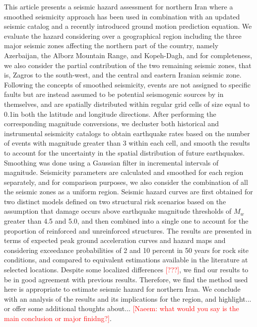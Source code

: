 % 
This article presents a seismic hazard assessment for northern Iran where a smoothed seismicity approach has been used in combination with an updated seismic catalog and a recently introduced ground motion prediction equation. We evaluate the hazard considering over a geographical region including the three major seismic zones affecting the northern part of the country, namely Azerbaijan, the Alborz Mountain Range, and Kopeh-Dagh, and for completeness, we also consider the partial contribution of the two remaining seismic zones, that is, Zagros to the south-west, and the central and eastern Iranian seismic zone. Following the concepts of smoothed seismicity, events are not assigned to specific faults but are instead assumed to be potential seismogenic sources by in themselves, and are spatially distributed within regular grid cells of size equal to 0.1\textdegree in both the latitude and longitude directions. After performing the corresponding magnitude conversions, we decluster both historical and instrumental seismicity catalogs to obtain earthquake rates based on the number of events with magnitude greater than 3 within each cell, and smooth the results to account for the uncertainty in the spatial distribution of future earthquakes. Smoothing was done using a Gaussian filter in incremental intervals of magnitude. Seismicity parameters are calculated and smoothed for each region separately, and for comparison purposes, we also consider the combination of all the seismic zones as a uniform region. Seismic hazard curves are first obtained for two distinct models defined on two structural risk scenarios based on the assumption that damage occurs above earthquake magnitude thresholds of $M_w$ greater than 4.5 and 5.0, and then combined into a single one to account for the proportion of reinforced and unreinforced structures. The results are presented in terms of expected peak ground acceleration curves and hazard maps and considering exceedance probabilities of 2 and 10 percent in 50 years for rock site conditions, and compared to equivalent estimations available in the literature at selected locations. Despite some localized differences \textcolor{red}{[???]}, we find our results to be in good agreement with previous results. Therefore, we find the method used here is appropriate to estimate seismic hazard for northern Iran. We conclude with an analysis of the results and its implications for the region, and highlight... or offer some additional thoughts about... \textcolor{red}{[Naeem: what would you say is the main conclusion or major finidng?]}.

